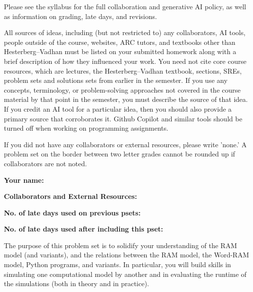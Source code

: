 \documentclass[11pt]{article}
\begin{document}

Please see the syllabus for the full collaboration and generative AI policy, as well as information on grading, late days, and revisions.

All sources of ideas, including (but not restricted to) any collaborators, AI tools, people outside of the course, websites, ARC tutors, and textbooks other than Hesterberg--Vadhan must be listed on your submitted homework along with a brief description of how they influenced your work. You need not cite core course resources, which are lectures, the Hesterberg--Vadhan textbook, sections, SREs, problem sets and solutions sets from earlier in the semester. If you use any concepts, terminology, or problem-solving approaches not covered in the course material by that point in the semester, you must describe the source of that idea. If you credit an AI tool for a particular idea, then you should also provide a primary source that corroborates it. Github Copilot and similar tools should be turned off when working on programming assignments.

If you did not have any collaborators or external resources, please write 'none.' A problem set on the border between two letter grades cannot be rounded up if collaborators are not noted.

\textbf{Your name: }

\textbf{Collaborators and External Resources:}

\textbf{No. of late days used on previous psets: }

\textbf{No. of late days used after including this pset: }

\vspace{1em}
The purpose of this problem set is to solidify your understanding of the RAM model (and variants), and the relations between the RAM model, the Word-RAM model, Python programs, and variants. In particular, you will build skills in simulating one computational model by another and in evaluating the runtime of the simulations (both in theory and in practice).
\end{document}

